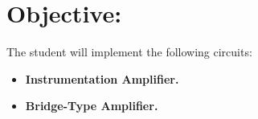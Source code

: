 \section{Objective:}

The student will implement the following circuits: 

\begin{itemize}
\item {\bfseries Instrumentation Amplifier.}
\item {\bfseries Bridge-Type Amplifier.} 
\end{itemize} 

\pagebreak